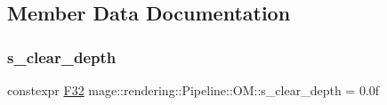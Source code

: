 \subsection{Member Data Documentation}
\hypertarget{structmage_1_1rendering_1_1_pipeline_1_1_o_m_a9eb4fec4852a3ca2e588a90818a706ec}{}\label{structmage_1_1rendering_1_1_pipeline_1_1_o_m_a9eb4fec4852a3ca2e588a90818a706ec} 
\subsubsection{\texorpdfstring{s\+\_\+clear\+\_\+depth}{s\_clear\_depth}}
{\footnotesize\ttfamily constexpr \hyperlink{namespacemage_aa97e833b45f06d60a0a9c4fc22ae02c0}{F32} mage\+::rendering\+::\+Pipeline\+::\+O\+M\+::s\+\_\+clear\+\_\+depth = 0.\+0f\hspace{0.3cm}{\ttfamily [static]}}


